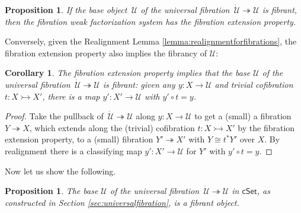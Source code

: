 \documentclass[11pt,reqno]{amsart}
\newcommand{\cSet}{\ensuremath{\mathsf{cSet}}}
\newcommand{\ra}{\ensuremath{\rightarrow}}
\newcommand{\cof}{\ensuremath{\rightarrowtail}}
\newcommand{\fib}{\ensuremath{\twoheadrightarrow}}
\newcommand{\onto}{\ensuremath{\twoheadrightarrow}}
\newcommand{\U}{\ensuremath{\mathcal{U}}}
\newcommand{\UU}{\ensuremath{\,\dot{\mathcal{U}}}}
\newtheorem{proposition}[theorem]{Proposition}
\newtheorem{corollary}[theorem]{Corollary}
\theoremstyle{remark}
\theoremstyle{definition}
\begin{document}
\begin{proposition}\label{prop:UfibtoFEP}
If the base object $\,\U$ of the universal fibration $\UU\fib\U$ is fibrant, then the fibration weak factorization system has the fibration extension property.
\end{proposition}

Conversely, given the Realignment Lemma \ref{lemma:realignmentforfibrations}, the fibration extension property also implies the fibrancy of $\U$:

\begin{corollary}
The fibration extension property implies that the base $\U$ of the universal fibration $\UU\fib\U$ is fibrant: given any $y : X \ra \U$ and trivial cofibration $t : X\cof X'$, there is a map $y' : X' \ra \U$  with $y'\circ t = y$.
\end{corollary}

\begin{proof}
Take the pullback of $\UU\fib\U$ along $y : X \ra \U$ to get a (small) a fibration $Y\fib X$, which extends along the (trivial) cofibration $t : X\cof X'$ by the fibration extension property,  to a (small) fibration $Y'\onto X'$ with $Y \cong t^*Y'$ over $X$.  By realignment there is a classifying map $y' : X' \ra \U$ for $Y'$ with $y'\circ t = y$.
\end{proof}

Now let us show the following.
\begin{proposition}\label{prop:Ufibrant}
The base $\U$ of the universal fibration $\UU\fib\U$ in $\cSet$, as constructed in Section \ref{sec:universalfibration}, is a fibrant object.
\end{proposition}
\end{document}
